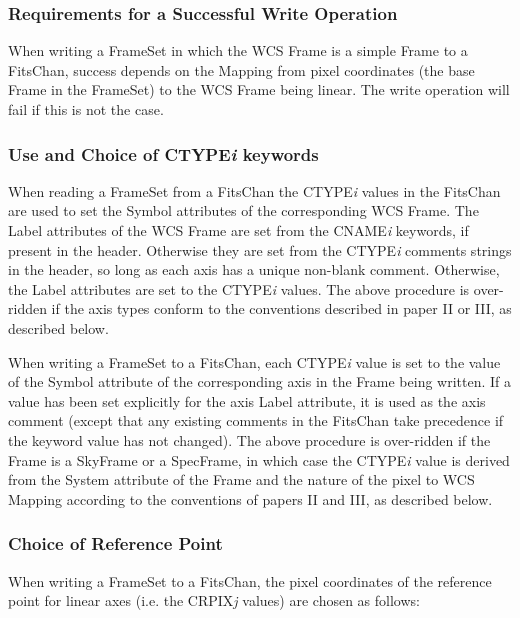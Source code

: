 \documentclass[twoside,11pt]{article}
\begin{document}
\subsubsection{Requirements for a Successful Write Operation}
When writing a FrameSet in which the WCS
Frame is a simple Frame to a FitsChan,
success depends on the Mapping from pixel coordinates
(the base Frame in the FrameSet) to the WCS Frame being linear. The write
operation will fail if this is not the case.

\subsubsection{Use and Choice of CTYPE\emph{i} keywords}
When reading a FrameSet from a FitsChan the CTYPE\emph{i} values in the FitsChan are used to set the
Symbol attributes of the corresponding WCS Frame. The Label attributes of the WCS Frame are set from 
the CNAME\emph{i} keywords, if present in the header. Otherwise they are set
from the CTYPE\emph{i} comments strings in the header, so long as each
axis has a unique non-blank comment. Otherwise, the Label attributes are
set to the CTYPE\emph{i} values. The above procedure is over-ridden if
the axis types conform to the conventions described in paper II or III,
as described below.

When writing a FrameSet to a FitsChan, each CTYPE\emph{i} value is set to
the value of the Symbol attribute of the corresponding axis in the Frame
being written. If a value has been set explicitly for the axis Label
attribute, it is used as the axis comment (except that any existing
comments in the FitsChan take precedence if the keyword value has not
changed). The above procedure is over-ridden if the Frame is a
SkyFrame or a SpecFrame, in which
case the CTYPE\emph{i} value is derived from the System
attribute of the Frame and the nature of the pixel to WCS Mapping
according to the conventions of papers II and III, as described below.

\subsubsection{Choice of Reference Point}
When writing a FrameSet to a
FitsChan, the pixel coordinates of the 
reference point for linear axes (i.e. the CRPIX\emph{j} values) are 
chosen as follows:
\end{document}
